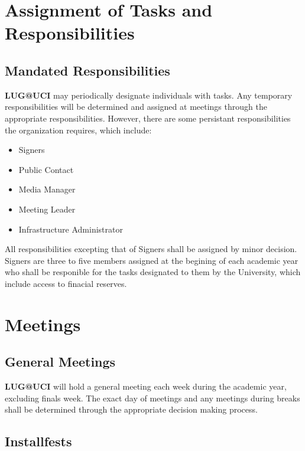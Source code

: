 \documentclass{article}
\begin{document}
\section{Assignment of Tasks and Responsibilities}



\subsection{Mandated Responsibilities}


\textbf{LUG@UCI} may periodically designate individuals with tasks.
Any temporary responsibilities will be determined and assigned at meetings
through the appropriate responsibilities. However, there are some persistant
responsibilities the organization requires, which include:

\begin{itemize}
\item Signers
\item Public Contact
\item Media Manager
\item Meeting Leader
\item Infrastructure Administrator
\end{itemize}

All responsibilities excepting that of Signers shall be assigned by minor
decision. Signers are three to five members assigned at the begining of each
academic year who shall be responible for the tasks designated to them by
the University, which include access to finacial reserves.

\section{Meetings}

\subsection{General Meetings}

\textbf{LUG@UCI} will hold a general meeting each week during the academic year,
excluding finals week. The exact day of meetings and any meetings during breaks
shall be determined through the appropriate decision making process.

\subsection{Installfests}
\end{document}
